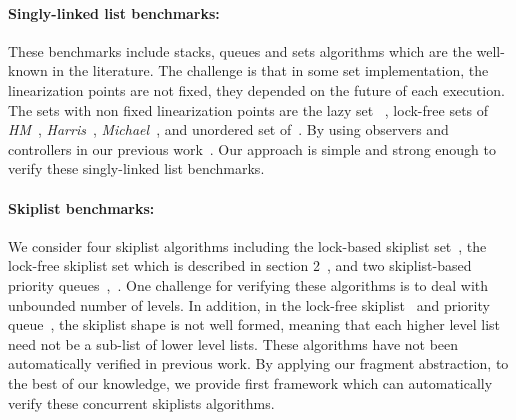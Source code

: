 \paragraph{Singly-linked list benchmarks:} These benchmarks include stacks, queues and sets algorithms which are the well-known in the literature. The challenge is that in some set implementation, the linearization points are not fixed, they depended on the future of each execution. The sets with non fixed linearization points are the lazy set ~\cite{Lazyset}, lock-free sets of {\it HM}~\cite{ArtOfMpP}, {\it Harris}~\cite{Harris:list}, {\it Michael}~\cite{Michael:list}, and unordered set of~\cite{Zhang:unorderedlist}. By using observers and controllers in our previous work~\cite{Quy:sas16}. Our approach is simple and strong enough to verify these singly-linked list benchmarks.


\paragraph{Skiplist benchmarks:} We consider four skiplist algorithms including the lock-based skiplist set~\cite{MS:QueueAlgorithms}, the lock-free skiplist set which is described in section 2~\cite{ArtOfMpP}, and two skiplist-based priority queues~\cite{Linden:opodis13},~\cite{Shavit:queue}. One challenge for verifying these algorithms is to deal with unbounded number of levels. In addition, in the lock-free skiplist~\cite{ArtOfMpP} and priority queue~\cite{Linden:opodis13}, the skiplist shape is not well formed, meaning that each higher level list need not be a sub-list of lower level lists. These algorithms have not been automatically verified in previous work. By applying our fragment abstraction,  to the best of our knowledge, we provide first framework which can automatically verify these concurrent skiplists algorithms.

